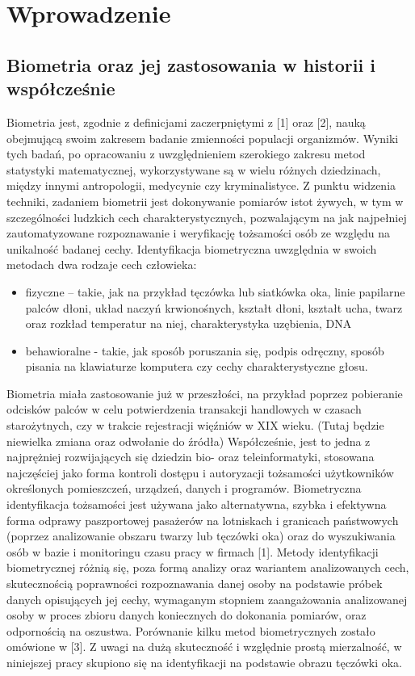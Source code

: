 \chapter{Wprowadzenie}
\label{cha:wprowadzenie}


\section{Biometria oraz jej zastosowania w historii i współcześnie}
\label{sec:biometria}

Biometria jest, zgodnie z definicjami zaczerpniętymi z [1] oraz [2], nauką obejmującą swoim zakresem badanie zmienności populacji organizmów. Wyniki tych badań, po opracowaniu z uwzględnieniem szerokiego zakresu metod statystyki matematycznej, wykorzystywane są w wielu różnych dziedzinach, między innymi antropologii, medycynie czy kryminalistyce. Z punktu widzenia techniki, zadaniem biometrii jest dokonywanie pomiarów istot żywych, w tym w szczególności ludzkich cech charakterystycznych, pozwalającym na jak najpełniej zautomatyzowane rozpoznawanie i weryfikację tożsamości osób ze względu na unikalność badanej cechy.
	Identyfikacja biometryczna uwzględnia w swoich metodach dwa rodzaje cech człowieka:
\begin{itemize} 
\item fizyczne – takie, jak na przykład tęczówka lub siatkówka oka, linie papilarne palców dłoni, układ naczyń krwionośnych, kształt dłoni, kształt ucha, twarz oraz rozkład temperatur na niej, charakterystyka uzębienia, DNA 
\item behawioralne - takie, jak sposób poruszania się, podpis odręczny, sposób pisania na klawiaturze komputera czy cechy charakterystyczne głosu.
\end{itemize}
	Biometria miała zastosowanie już w przeszłości, na przykład poprzez pobieranie odcisków palców w celu potwierdzenia transakcji handlowych w czasach starożytnych, czy w trakcie rejestracji więźniów w XIX wieku. (Tutaj będzie niewielka zmiana oraz odwołanie do źródła) Współcześnie, jest to jedna z najprężniej rozwijających się dziedzin bio- oraz teleinformatyki, stosowana najczęściej jako forma kontroli dostępu i autoryzacji tożsamości użytkowników określonych pomieszczeń, urządzeń, danych i programów. Biometryczna identyfikacja tożsamości jest używana jako alternatywna, szybka i efektywna forma odprawy paszportowej pasażerów na lotniskach i granicach państwowych (poprzez analizowanie obszaru twarzy lub tęczówki oka) oraz do wyszukiwania osób w bazie i monitoringu czasu pracy w firmach [1].
	Metody identyfikacji biometrycznej różnią się, poza formą analizy oraz wariantem analizowanych cech, skutecznością poprawności rozpoznawania danej osoby na podstawie próbek danych opisujących jej cechy, wymaganym stopniem zaangażowania analizowanej osoby w proces zbioru danych koniecznych do dokonania pomiarów, oraz odpornością na oszustwa. Porównanie kilku metod biometrycznych zostało omówione w [3]. Z uwagi na dużą skuteczność i względnie prostą mierzalność, w niniejszej pracy skupiono się na identyfikacji na podstawie obrazu tęczówki oka.


